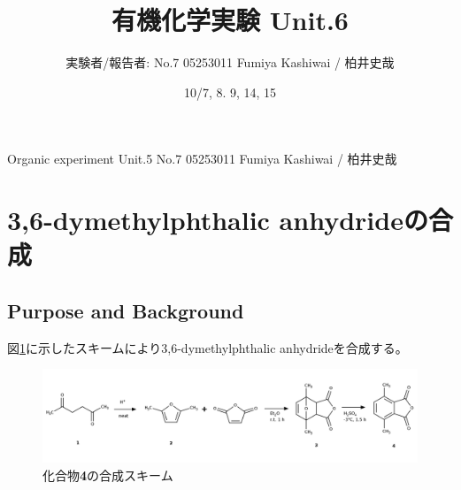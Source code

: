 \documentclass{ltjsarticle}
\title{有機化学実験 Unit.6}
\date{10/7, 8. 9, 14, 15}
\author{実験者/報告者: No.7 05253011 Fumiya Kashiwai / 柏井史哉}
\theoremstyle{definition}
\numberwithin{equation}{section}
\begin{document}
\maketitle
{} {Organic experiment Unit.5 No.7 05253011 Fumiya Kashiwai / 柏井史哉}

\newpage
\section{3,6-dymethylphthalic anhydrideの合成}
\subsection{Purpose and Background}
図\ref{scheme_6-1}に示したスキームにより3,6-dymethylphthalic anhydrideを合成する。
\begin{figure}[htbp]
\begin{center}
\includegraphics[width = 15 cm]{scheme_6-1.png}
\caption{化合物\textbf{4}の合成スキーム}
\label{scheme_6-1}
\end{center}
\end{figure}
\end{document}
